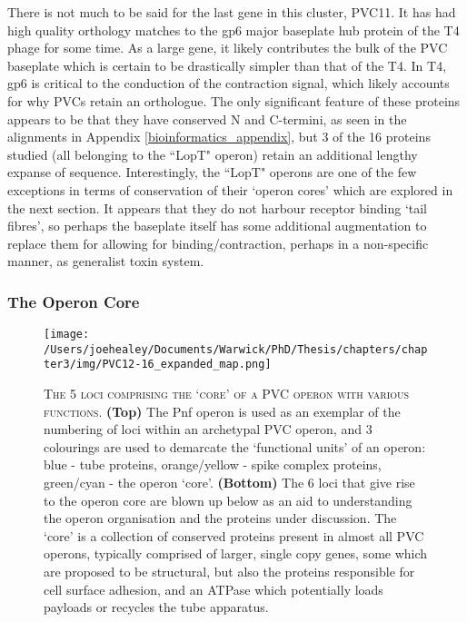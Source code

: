 There is not much to be said for the last gene in this cluster, PVC11. It has had high quality orthology matches to the gp6 major baseplate hub protein of the T4 phage for some time. As a large gene, it likely contributes the bulk of the PVC baseplate which is certain to be drastically simpler than that of the T4. In T4, gp6 is critical to the conduction of the contraction signal, which likely accounts for why PVCs retain an orthologue. The only significant feature of these proteins appears to be that they have conserved N and C-termini, as seen in the alignments in Appendix \vref{bioinformatics_appendix}, but 3 of the 16 proteins studied (all belonging to the ``LopT" operon) retain an additional lengthy expanse of sequence. Interestingly, the ``LopT" operons are one of the few exceptions in terms of conservation of their `operon cores' which are explored in the next section. It appears that they do not harbour receptor binding `tail fibres', so perhaps the baseplate itself has some additional augmentation to replace them for allowing for binding/contraction, perhaps in a non-specific manner, as generalist toxin system.


\clearpage

\subsubsection{The Operon Core}
\begin{figure}[h!]
\texttt{[image: /Users/joehealey/Documents/Warwick/PhD/Thesis/chapters/chapter3/img/PVC12-16\_expanded\_map.png]}
	\captionsetup{singlelinecheck=off, justification=justified, font=footnotesize, aboveskip=10pt}
	\caption[`Core' protein region of a PVC operon]{\textsc{\normalsize The 5 loci comprising the `core' of a PVC operon with various functions.}\vspace{0.1cm} \newline \textbf{(Top)} The Pnf operon is used as an exemplar of the numbering of loci within an archetypal PVC operon, and 3 colourings are used to demarcate the `functional units' of an operon: blue - tube proteins, orange/yellow - spike complex proteins, green/cyan - the operon `core'. \textbf{(Bottom)} The 6 loci that give rise to the operon core are blown up below as an aid to understanding the operon organisation and the proteins under discussion. The `core' is a collection of conserved proteins present in almost all PVC operons, typically comprised of larger, single copy genes, some which are proposed to be structural, but also the proteins responsible for cell surface adhesion, and an ATPase which potentially loads payloads or recycles the tube apparatus.}
	\label{PVC11-16map}
\end{figure}

